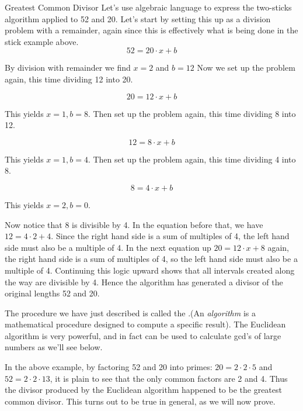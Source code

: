 \begin {example} {Greatest Common Divisor}
Let's use algebraic language to express the two-sticks algorithm applied to 52 and 20.
Let's start by setting this up as a division problem with a remainder, again since this is effectively what is being done in the stick example above.
\[ 52 = 20\cdot x + b\]

By division with remainder we find $x=2$ and $b=12$
Now we set up the problem again, this time dividing 12 into 20. 

\[ 20 = 12\cdot x + b\]

This yields $x=1, b=8$.  Then set up the problem again, this time dividing 8 into 12.

\[ 12 = 8\cdot x + b\]

This yields $x=1, b=4$.  Then set up the problem again, this time dividing 4 into 8.

\[ 8 = 4\cdot x + b\]

This yields $x=2, b=0$.  

Now notice that 8 is divisible by 4.  In the equation before that, we have $12 = 4\cdot2 + 4$.  Since the right hand side is a sum of multiples of 4, the left hand side must also be a multiple of 4.  In the next equation up $20=12\cdot x + 8$ again, the right hand side is a sum of multiples of 4, so the left hand side must also be a multiple of 4.  Continuing this logic upward shows that all intervals created along the way are divisible by 4.  Hence the algorithm has generated a divisor of the original lengths 52 and 20.  

The procedure we have just described is called the .(An \emph{algorithm} is a mathematical procedure designed to compute a specific result). The Euclidean algorithm is very powerful, and in fact can be used to calculate gcd's of large numbers as we'll see below.

 In the above example,  by factoring 52 and 20 into primes: $20=2\cdot2\cdot5$ and $52=2\cdot2\cdot13$, it is plain to see that the only common factors are 2 and 4.  Thus the divisor produced by the Euclidean algorithm happened to be the greatest common divisor. This turns out to be true in general, as we will now prove.

\end{example}

